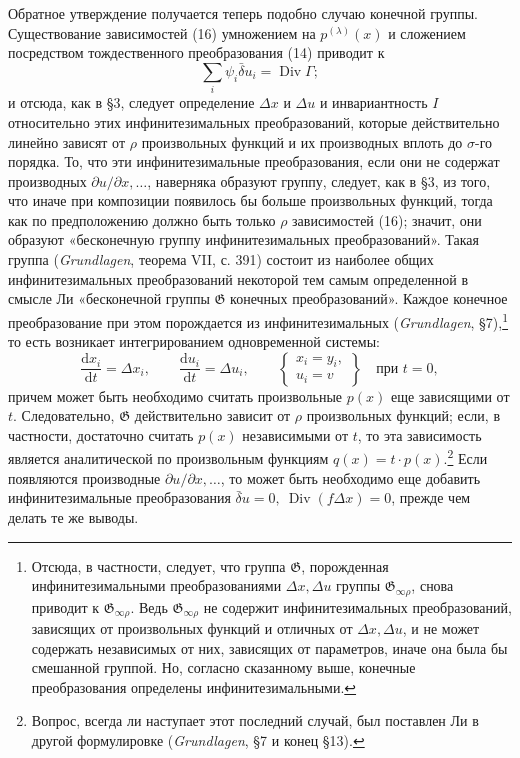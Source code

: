 \documentclass[11pt]{article}
\providecommand{\G}{\mathfrak G}
\providecommand{\D}{\Delta}
\providecommand{\p}{\partial}
\providecommand{\dd}{\mathrm d}
\DeclareMathOperator{\Div}{Div}
\providecommand{\bd}{\bar{\delta}}
\begin{document}
Обратное утверждение получается теперь подобно случаю конечной группы. Существование зависимостей (16) умножением на \(p^{(\lambda)}(x)\) и сложением посредством тождественного преобразования (14) приводит к
\[
\sum_i\psi_i\bd u_i=\Div\Gamma;
\]
и отсюда, как в \S{}3, следует определение \(\D x\) и \(\D u\) и инвариантность \(I\) относительно этих инфинитезимальных преобразований, которые действительно линейно зависят от \(\rho\) произвольных функций и их производных вплоть до \(\sigma\)-го порядка. То, что эти инфинитезимальные преобразования, если они не содержат производных \(\p u/\p x,\ldots\), наверняка образуют группу, следует, как в \S{}3, из того, что иначе при композиции появилось бы больше произвольных функций, тогда как по предположению должно быть только \(\rho\) зависимостей (16); значит, они образуют «бесконечную группу инфинитезимальных преобразований». Такая группа (\emph{Grundlagen}, теорема VII, с. 391) состоит из наиболее общих инфинитезимальных преобразований некоторой тем самым определенной в смысле Ли «бесконечной группы \(\G\) конечных преобразований». Каждое конечное преобразование при этом порождается из инфинитезимальных (\emph{Grundlagen}, \S{}7),\footnote{Отсюда, в частности, следует, что группа \(\G\), порожденная инфинитезимальными преобразованиями \(\D x,\D u\) группы \(\G_{\infty\rho}\), снова приводит к \(\G_{\infty\rho}\). Ведь \(\G_{\infty\rho}\) не содержит инфинитезимальных преобразований, зависящих от произвольных функций и отличных от \(\D x,\D u\), и не может содержать независимых от них, зависящих от параметров, иначе она была бы смешанной группой. Но, согласно сказанному выше, конечные преобразования определены инфинитезимальными.} то есть возникает интегрированием одновременной системы:
\[
\frac{\dd x_i}{\dd t}=\D x_i,\qquad
\frac{\dd u_i}{\dd t}=\D u_i,\qquad
\left\{\begin{array}{l}
x_i=y_i,\\
u_i=v
\end{array}\right\}
\quad\text{при }t=0,
\]
причем может быть необходимо считать произвольные \(p(x)\) еще зависящими от \(t\). Следовательно, \(\G\) действительно зависит от \(\rho\) произвольных функций; если, в частности, достаточно считать \(p(x)\) независимыми от \(t\), то эта зависимость является аналитической по произвольным функциям \(q(x)=t\cdot p(x)\).\footnote{Вопрос, всегда ли наступает этот последний случай, был поставлен Ли в другой формулировке (\emph{Grundlagen}, \S{}7 и конец \S{}13).} Если появляются производные \(\p u/\p x,\ldots\), то может быть необходимо еще добавить инфинитезимальные преобразования \(\bd u=0,\ \Div(f\D x)=0\), прежде чем делать те же выводы.
\end{document}
